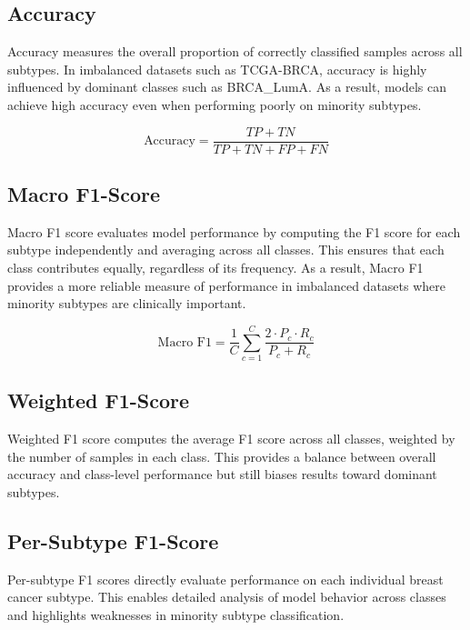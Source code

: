 \documentclass[10pt,twocolumn,letterpaper]{article}
\begin{document}
\subsection{Accuracy}

Accuracy measures the overall proportion of correctly classified samples across all subtypes. In imbalanced datasets such as TCGA-BRCA, accuracy is highly influenced by dominant classes such as BRCA\_LumA. As a result, models can achieve high accuracy even when performing poorly on minority subtypes.

\begin{equation}
    \text{Accuracy} = \frac{TP + TN}{TP + TN + FP + FN}
\end{equation}

\subsection{Macro F1-Score}

Macro F1 score evaluates model performance by computing the F1 score for each subtype independently and averaging across all classes. This ensures that each class contributes equally, regardless of its frequency. As a result, Macro F1 provides a more reliable measure of performance in imbalanced datasets where minority subtypes are clinically important.

\begin{equation}
    \text{Macro F1} = \frac{1}{C} \sum_{c=1}^{C} \frac{2 \cdot P_c \cdot R_c}{P_c + R_c}
\end{equation}

\subsection{Weighted F1-Score}

Weighted F1 score computes the average F1 score across all classes, weighted by the number of samples in each class. This provides a balance between overall accuracy and class-level performance but still biases results toward dominant subtypes.

\subsection{Per-Subtype F1-Score}

Per-subtype F1 scores directly evaluate performance on each individual breast cancer subtype. This enables detailed analysis of model behavior across classes and highlights weaknesses in minority subtype classification.
\end{document}
